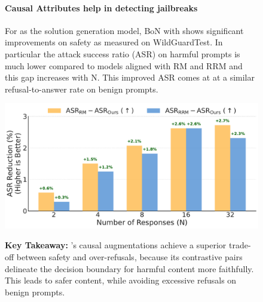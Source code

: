 \begin{figure}[!h]
  \centering
  \begin{minipage}[t]{0.45\textwidth}
  \paragraph{Causal Attributes help in detecting jailbreaks}
For  as the solution generation model, BoN with \carma{} shows significant improvements on safety as measured on WildGuardTest. In particular the attack success ratio (ASR) on harmful prompts is much lower compared to models aligned with RM and RRM and this gap increases with N. This improved ASR comes at at a similar refusal-to-answer rate on benign prompts.

  \end{minipage}\hfill          %
  \begin{minipage}[t]{0.50\textwidth}
    \vspace{-0.15in}
    \centering
    \includegraphics[width=0.95\linewidth]{images/asr_reduction_gemma9B_pairpm.pdf}
    \vspace{-0.10in}
    \label{fig:asr_reduction_gemma9b}
  \end{minipage}


\vspace{0.03in}
\begin{takeawaybox}
\textbf{Key Takeaway:} \carma{}'s causal augmentations achieve a superior trade-off between safety and over-refusals, because its contrastive pairs delineate the decision boundary for harmful content more faithfully. This leads to safer content, while avoiding excessive refusals on benign prompts.

\end{takeawaybox}
\vspace{0.03in}
\end{figure}

